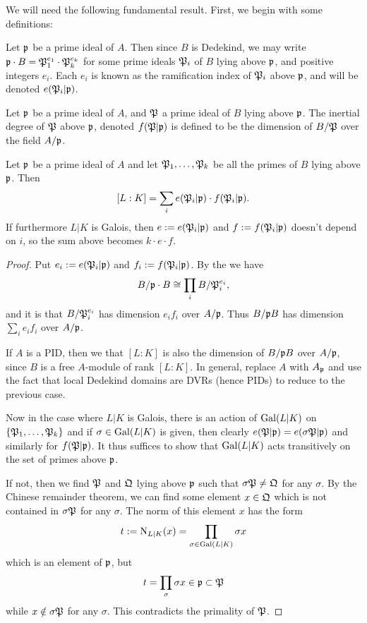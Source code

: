 We will need the following fundamental result. First, we begin with some definitions:

\begin{definition}
  Let $\mathfrak{p}$ be a prime ideal of $A$. 
  Then since $B$ is Dedekind, we may write $\mathfrak{p} \cdot B = \mathfrak{P}_1^{e_1}\cdot\mathfrak{P}_k^{e_k}$ for some prime ideals $\mathfrak{P}_i$ of $B$ lying above $\mathfrak{p}$, and positive integers $e_i$.
  Each $e_i$ is known as the ramification index of $\mathfrak{P}_i$ above $\mathfrak{p}$, and will be denoted $e(\mathfrak{P}_i|\mathfrak{p})$. 
\end{definition}
\begin{definition}
  Let $\mathfrak{p}$ be a prime ideal of $A$, and $\mathfrak{P}$ a prime ideal of $B$ lying above $\mathfrak{p}$.
  The inertial degree of $\mathfrak{P}$ above $\mathfrak{p}$, denoted $f(\mathfrak{P}|\mathfrak{p})$ is defined to be the dimension of $B/\mathfrak{P}$ over the field $A/\mathfrak{p}$.
\end{definition}
\begin{lemma}\label{lemma:fundamental_equality}
  Let $\mathfrak{p}$ be a prime ideal of $A$ and let $\mathfrak{P}_{1},\ldots,\mathfrak{P}_{k}$ be all the primes of $B$ lying above $\mathfrak{p}$.
  Then
  \[ [L:K] = \sum_{i} e(\mathfrak{P}_{i}|\mathfrak{p}) \cdot f(\mathfrak{P}_{i}|\mathfrak{p}). \]
  If furthermore $L|K$ is Galois, then $e := e(\mathfrak{P}_{i}|\mathfrak{p})$ and $f := f(\mathfrak{P}_{i}|\mathfrak{p})$ doesn't depend on $i$, so the sum above becomes $k \cdot e \cdot f$.
\end{lemma}
\begin{proof}
  Put $e_{i} := e(\mathfrak{P}_{i}|\mathfrak{p})$ and $f_{i} := f(\mathfrak{P}_{i}|\mathfrak{p})$.
  By the  we have
  \[ B/\mathfrak{p} \cdot B \cong \prod_{i} B/\mathfrak{P}_{i}^{e_{i}}, \]
  and it is  that $B/\mathfrak{P}_{i}^{e_{i}}$ has dimension $e_{i} f_{i}$ over $A/\mathfrak{p}$.
  Thus $B/\mathfrak{p} B$ has dimension $\sum_{i} e_{i} f_{i}$ over $A/\mathfrak{p}$.

  If $A$ is a PID, then we  that $[L:K]$ is also the dimension of $B/\mathfrak{p} B$ over $A/\mathfrak{p}$, since $B$ is a free $A$-module of rank $[L:K]$.
  In general, replace $A$ with $A_{\mathfrak{p}}$ and use the fact that local Dedekind domains are DVRs (hence PIDs) to reduce to the previous case.

  Now in the case where $L|K$ is Galois, there is an action of $\operatorname{Gal}(L|K)$ on $\{\mathfrak{P}_{1},\ldots,\mathfrak{P}_{k}\}$ and if $\sigma \in \operatorname{Gal}(L|K)$ is given, then clearly $e(\mathfrak{P}|\mathfrak{p}) = e(\sigma\mathfrak{P}|\mathfrak{p})$ and similarly for $f(\mathfrak{P}|\mathfrak{p})$.
  It thus suffices to show that $\operatorname{Gal}(L|K)$ acts transitively on the set of primes above $\mathfrak{p}$.

  If not, then we find $\mathfrak{P}$ and $\mathfrak{Q}$ lying above $\mathfrak{p}$ such that $\sigma\mathfrak{P} \neq \mathfrak{Q}$ for any $\sigma$.
  By the Chinese remainder theorem, we can find some element $x \in \mathfrak{Q}$ which is not contained in $\sigma\mathfrak{P}$ for any $\sigma$.
  The norm of this element $x$ has the form
  \[ t := \operatorname{N}_{L|K}(x) = \prod_{\sigma \in \operatorname{Gal}(L|K)} \sigma x \]
  which is an element of $\mathfrak{p}$, but
  \[ t = \prod_{\sigma} \sigma x \in \mathfrak{p} \subset \mathfrak{P} \]
  while $x \notin \sigma \mathfrak{P}$ for any $\sigma$.
  This contradicts the primality of $\mathfrak{P}$.
\end{proof}

